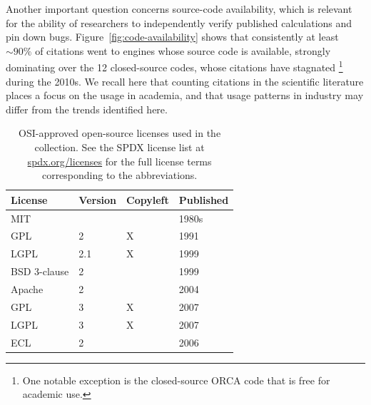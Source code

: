 \documentclass[9pt,review]{livecoms}
\begin{document}
Another important question concerns  source-code availability, which is relevant for the ability of researchers to independently verify published calculations and pin down bugs.
Figure~\ref{fig:code-availability} shows that consistently at least ${\sim}90\%$ of citations went to engines whose source code is available, strongly dominating over the 12 closed-source codes, whose citations have stagnated%
\footnote{One notable exception is the closed-source ORCA code \cite{Neese2020} that is free for academic use.} 
during the 2010s.
We recall here that counting citations in the scientific literature places a focus on the usage in academia, and that usage patterns in industry may differ from the trends identified here.

\begin{table}
    \centering
    \begin{tabular}{llll} \toprule
        License & Version & Copyleft & Published  \\ \midrule
        MIT &   &   & 1980s\\
        GPL & 2 & X & 1991\\
        LGPL & 2.1 & X & 1999\\
        BSD 3-clause & 2 &   & 1999\\
        Apache & 2 &   & 2004\\
        GPL & 3 & X & 2007\\
        LGPL & 3 & X & 2007\\
        ECL & 2 &   & 2006\\
\bottomrule
    \end{tabular}
    \caption{
        OSI-approved open-source licenses used in the collection.
        See the SPDX license list at \url{spdx.org/licenses} for the full license terms corresponding to the abbreviations.
    }
    \label{tab:open-source-licenses}
\end{table}

\end{document}

